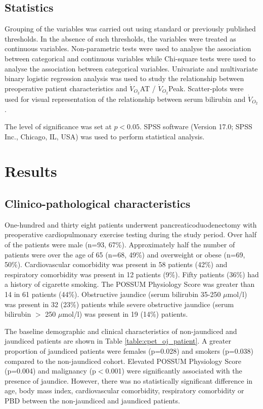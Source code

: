 \subsection{Statistics}
Grouping of the variables was carried out using standard or previously published thresholds. 
In the absence of such thresholds, the variables were treated as continuous variables. 
Non-parametric tests were used to analyse the association between categorical and continuous variables while Chi-square tests were used to analyse the association between categorical variables. 
Univariate and multivariate binary logistic regression analysis was used to study the relationship between preoperative patient characteristics and $\dot{V}_{O_2}$AT / $\dot{V}_{O_2}$Peak. 
Scatter-plots were used for visual representation of the relationship between serum bilirubin and $\dot{V}_{O_2}$.

The level of significance was set at $p<0.05$.
SPSS software (Version 17.0; SPSS Inc., Chicago, IL, USA) was used to perform statistical analysis.

\clearpage

\section{Results}

\subsection{Clinico-pathological characteristics}
One-hundred and thirty eight patients underwent pancreaticoduodenectomy with preoperative cardiopulmonary exercise testing during the study period. 
Over half of the patients were male (n=93, 67\%). 
Approximately half the number of patients were over the age of 65 (n=68, 49\%) and overweight or obese (n=69, 50\%). 
Cardiovascular comorbidity was present in 58 patients (42\%) and respiratory comorbidity was present in 12 patients (9\%). 
Fifty patients (36\%) had a history of cigarette smoking. 
The POSSUM Physiology Score was greater than 14 in 61 patients (44\%). 
Obstructive jaundice (serum bilirubin 35-250 $\mu$mol/l) was present in 32 (23\%) patients while severe obstructive jaundice (serum bilirubin $>$ 250 $\mu$mol/l) was present in 19 (14\%) patients. 

The baseline demographic and clinical characteristics of non-jaundiced and jaundiced patients are shown in Table \ref{table:cpet_oj_patient}. 
A greater proportion of jaundiced patients were females (p=0.028) and smokers (p=0.038) compared to the non-jaundiced cohort. 
Elevated POSSUM Physiology Score (p=0.004) and malignancy (p$<$0.001) were significantly associated with the presence of jaundice. 
However, there was no statistically significant difference in age, body mass index, cardiovascular comorbidity, respiratory comorbidity or PBD between the non-jaundiced and jaundiced patients.

